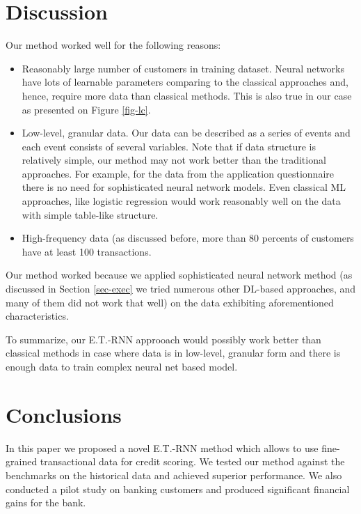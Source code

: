 \documentclass[sigconf]{acmart}
\begin{document}
\section{Discussion}

Our method worked well for the following reasons:
\begin{itemize}
    \item Reasonably large number of customers in training dataset. Neural networks have lots of learnable parameters comparing to the classical approaches and, hence, require more data than classical methods. This is also true in our case as presented on Figure \ref{fig-lc}.
    \item Low-level, granular data. Our data can be described as a series of events and each event consists of several variables. Note that if data structure is relatively simple, our method may not work better than the traditional approaches. For example, for the data from the application questionnaire there is no need for sophisticated neural network models. Even classical ML approaches, like logistic regression would work reasonably well on the data with simple table-like structure.
    \item High-frequency data (as discussed before, more than 80 percents of customers have at least 100 transactions.
\end{itemize}

Our method worked because we applied sophisticated neural network method (as discussed in Section \ref{sec-exec} we tried numerous other DL-based approaches, and many of them did not work that well) on the data exhibiting aforementioned characteristics.

To summarize, our E.T.-RNN approoach would possibly work better than classical methods in case where data is in low-level, granular form and there is enough data to train complex neural net based model.

\section{Conclusions}

In this paper we proposed a novel E.T.-RNN method which allows to use fine-grained transactional data for credit scoring.
We tested our method against the benchmarks on the historical data and achieved superior performance. We also conducted a pilot study on banking customers and produced significant financial gains for the bank.
\end{document}
